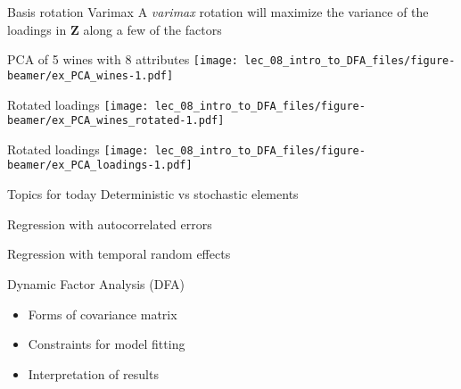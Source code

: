 \documentclass[
  ignorenonframetext,
]{beamer}
\begin{document}
\begin{frame}{Basis rotation \textbar{} Varimax}
\protect\hypertarget{basis-rotation-varimax}{}
A \emph{varimax} rotation will maximize the variance of the loadings in
\(\mathbf{Z}\) along a few of the factors
\end{frame}

\begin{frame}{PCA of 5 wines with 8 attributes}
\protect\hypertarget{pca-of-5-wines-with-8-attributes}{}
\texttt{[image: lec\_08\_intro\_to\_DFA\_files/figure-beamer/ex\_PCA\_wines-1.pdf]}
\end{frame}

\begin{frame}{Rotated loadings}
\protect\hypertarget{rotated-loadings}{}
\texttt{[image: lec\_08\_intro\_to\_DFA\_files/figure-beamer/ex\_PCA\_wines\_rotated-1.pdf]}
\end{frame}

\begin{frame}{Rotated loadings}
\protect\hypertarget{rotated-loadings-1}{}
\texttt{[image: lec\_08\_intro\_to\_DFA\_files/figure-beamer/ex\_PCA\_loadings-1.pdf]}
\end{frame}

\begin{frame}{Topics for today}
\protect\hypertarget{topics-for-today-1}{}
Deterministic vs stochastic elements

Regression with autocorrelated errors

Regression with temporal random effects

Dynamic Factor Analysis (DFA)

\begin{itemize}
\item
  Forms of covariance matrix
\item
  Constraints for model fitting
\item
  Interpretation of results
\end{itemize}
\end{frame}
\end{document}
